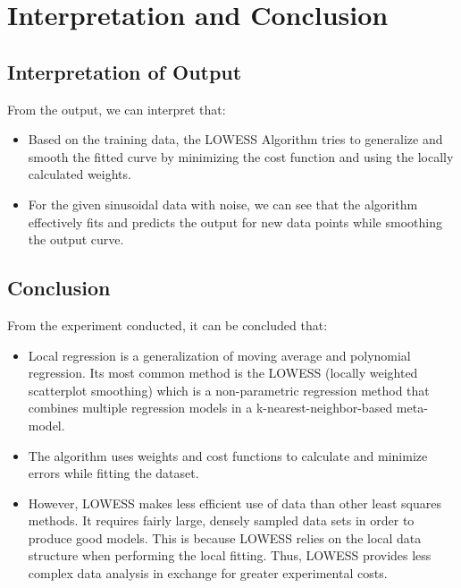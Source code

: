 \documentclass[11pt]{article}
\begin{document}
    \begin{center}
    \end{center}

    
\section{Interpretation and Conclusion}
\subsection{Interpretation of Output}
From the output, we can interpret that:
\begin{itemize}
    \item Based on the training data, the LOWESS Algorithm tries to generalize and smooth the fitted curve by minimizing the cost function and using the locally calculated weights.
    \item For the given sinusoidal data with noise, we can see that the algorithm effectively fits and predicts the output for new data points while smoothing the output curve.
\end{itemize}

\subsection{Conclusion}
From the experiment conducted, it can be concluded that:
\begin{itemize}
    \item Local regression is a generalization of moving average and polynomial regression. Its most common method is the LOWESS (locally weighted scatterplot smoothing) which is a non-parametric regression method that combines multiple regression models in a k-nearest-neighbor-based meta-model.
    \item The algorithm uses weights and cost functions to calculate and minimize errors while fitting the dataset.
    \item However, LOWESS makes less efficient use of data than other least squares methods. It requires fairly large, densely sampled data sets in order to produce good models. This is because LOWESS relies on the local data structure when performing the local fitting. Thus, LOWESS provides less complex data analysis in exchange for greater experimental costs.
\end{itemize}
    
    
    
    
\end{document}
